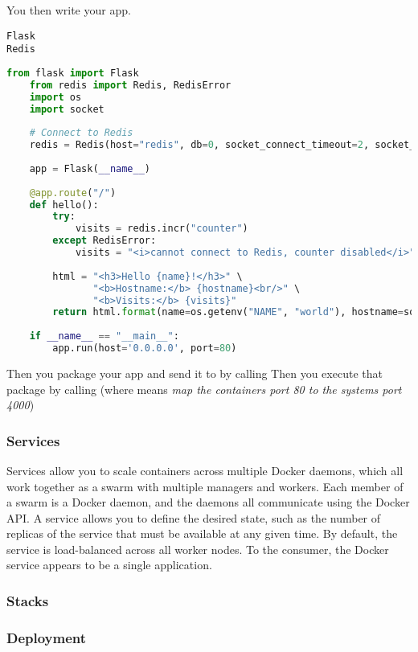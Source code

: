 You then write your app. 
\begin{lstlisting}[caption=requirements.txt]
Flask
Redis
\end{lstlisting}

\begin{lstlisting}[language=python, caption=main.py]
    from flask import Flask
    from redis import Redis, RedisError
    import os
    import socket
    
    # Connect to Redis
    redis = Redis(host="redis", db=0, socket_connect_timeout=2, socket_timeout=2)
    
    app = Flask(__name__)
    
    @app.route("/")
    def hello():
        try:
            visits = redis.incr("counter")
        except RedisError:
            visits = "<i>cannot connect to Redis, counter disabled</i>"
    
        html = "<h3>Hello {name}!</h3>" \
               "<b>Hostname:</b> {hostname}<br/>" \
               "<b>Visits:</b> {visits}"
        return html.format(name=os.getenv("NAME", "world"), hostname=socket.gethostname(), visits=visits)
    
    if __name__ == "__main__":
        app.run(host='0.0.0.0', port=80)
\end{lstlisting}
Then you package your app and send it to  by calling 
Then you execute that package by calling  (where  means \emph{map the containers port 80 to the systems port 4000})


\subsubsection{Services}

Services allow you to scale containers across multiple Docker daemons, which all work together as a swarm with multiple managers and workers. Each member of a swarm is a Docker daemon, and the daemons all communicate using the Docker API. A service allows you to define the desired state, such as the number of replicas of the service that must be available at any given time. By default, the service is load-balanced across all worker nodes. To the consumer, the Docker service appears to be a single application. 

\subsubsection{Stacks}

\subsubsection{Deployment}

